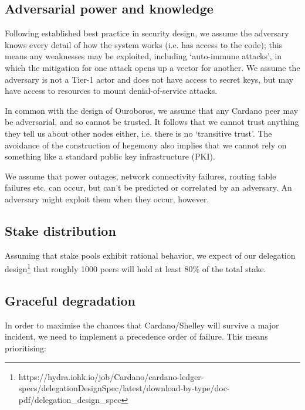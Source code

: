 \documentclass[11pt,a4paper]{article}
\begin{document}
\subsection{Adversarial power and knowledge}
\label{adversarial-power-and-knowledge}

Following established best practice in security design, we assume the
adversary knows every detail of how the system works (i.e. has access to
the code); this means any weaknesses may be exploited, including
`auto-immune attacks', in which the mitigation for one attack opens up a
vector for another. We assume the adversary is not a Tier-1 actor and
does not have access to secret keys, but may have access to resources to
mount denial-of-service attacks.

In common with the design of Ouroboros, we assume that any Cardano peer
may be adversarial, and so cannot be trusted. It follows that we cannot
trust anything they tell us about other nodes either, i.e. there is no
`transitive trust'. The avoidance of the construction of hegemony also
implies that we cannot rely on something like a standard public key
infrastructure (PKI).

We assume that power outages, network connectivity failures, routing
table failures etc. can occur, but can't be predicted or correlated by
an adversary. An adversary might exploit them when they occur, however.

\subsection{Stake distribution}
\label{stake-distribution}

Assuming that stake pools exhibit rational behavior, we expect of our
delegation design\footnote{https://hydra.iohk.io/job/Cardano/cardano-ledger-specs/delegationDesignSpec/latest/download-by-type/doc-pdf/delegation\_design\_spec}
that roughly {1000 peers} will hold at least 80\% of the total stake.

\subsection{Graceful degradation}
\label{graceful-degradation}

In order to maximise the chances that Cardano/Shelley will survive a
major incident, we need to implement a precedence order of failure. This
means prioritising:
\end{document}
